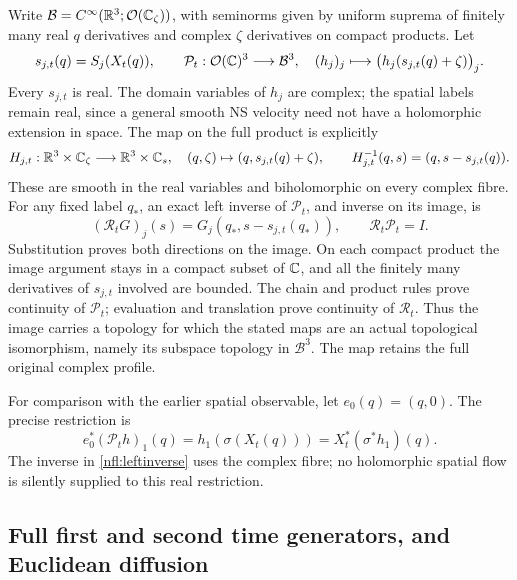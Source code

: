 Write $\mathcal B=C^\infty(\mathbb R^3;\mathcal O(\mathbb C_\zeta))$, with seminorms
given by uniform suprema of finitely many real $q$ derivatives and
complex $\zeta$ derivatives on compact products. Let
\[
 s_{j,t}(q)=S_j(X_t(q)),\qquad
 \mathcal P_t:\mathcal O(\mathbb C)^3\longrightarrow\mathcal B^3,
 \quad (h_j)_j\longmapsto
       \bigl(h_j(s_{j,t}(q)+\zeta)\bigr)_j.
\]
Every $s_{j,t}$ is real. The domain variables of $h_j$ are complex;
the spatial labels remain real, since a general smooth NS velocity
need not have a holomorphic extension in space. The map on the full
product is explicitly
\begin{equation}
 H_{j,t}:\mathbb R^3\times\mathbb C_\zeta\longrightarrow\mathbb R^3\times\mathbb C_s,
 \quad(q,\zeta)\mapsto(q,s_{j,t}(q)+\zeta),\qquad
 H_{j,t}^{-1}(q,s)=(q,s-s_{j,t}(q)).
 \label{nfl:skew}
\end{equation}
These are smooth in the real variables and biholomorphic on every
complex fibre. For any fixed label $q_*$, an exact left inverse of
$\mathcal P_t$, and inverse on its image, is
\begin{equation}
 (\mathcal R_tG)_j(s)=G_j(q_*,s-s_{j,t}(q_*)),\qquad
 \mathcal R_t\mathcal P_t=I.
 \label{nfl:leftinverse}
\end{equation}
Substitution proves both directions on the image. On each compact
product the image argument stays in a compact subset of $\mathbb C$, and all
the finitely many derivatives of $s_{j,t}$ involved are bounded.
The chain and product rules prove continuity of $\mathcal P_t$;
evaluation and translation prove continuity of $\mathcal R_t$.
Thus the image carries a topology for which the stated maps are an
actual topological isomorphism, namely its subspace topology in
$\mathcal B^3$. The map retains the full original complex profile.

For comparison with the earlier spatial observable, let
$e_0(q)=(q,0)$. The precise restriction is
\[
 e_0^*(\mathcal P_th)_1(q)=h_1(\sigma(X_t(q)))
     =X_t^*(\sigma^*h_1)(q).
\]
The inverse in \eqref{nfl:leftinverse} uses the complex fibre; no
holomorphic spatial flow is silently supplied to this real restriction.

\subsection{Full first and second time generators, and Euclidean diffusion}

